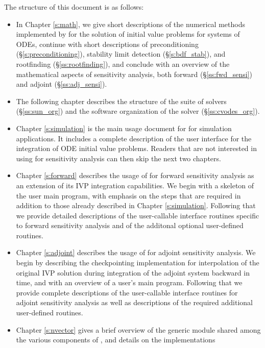 The structure of this document is as follows:
\begin{itemize}
\item
  In Chapter \ref{s:math}, we give short descriptions of the numerical 
  methods implemented by {\cvodes} for the solution of initial value problems
  for systems of ODEs, continue with short descriptions of preconditioning
  (\S\ref{s:preconditioning}), stability limit detection (\S\ref{s:bdf_stab}),
  and rootfinding (\S\ref{ss:rootfinding}), and conclude with an overview of the
  mathematical aspects of sensitivity analysis, both forward (\S\ref{ss:fwd_sensi})
  and adjoint (\S\ref{ss:adj_sensi}).
\item
  The following chapter describes the structure of the {\sundials} suite
  of solvers (\S\ref{ss:sun_org}) and the software organization of the {\cvodes}
  solver (\S\ref{ss:cvodes_org}). 
\item
  Chapter \ref{s:simulation} is the main usage document for {\cvodes}
  for simulation applications.  It includes a complete description of
  the user interface for the integration of ODE initial value problems.
  Readers that are not interested in using {\cvodes} for sensitivity
  analysis can then skip the next two chapters.
\item
  Chapter \ref{s:forward} describes the usage of {\cvodes} for forward
  sensitivity analysis as an extension of its IVP integration
  capabilities.  We begin with a skeleton of the user main program,
  with emphasis on the steps that are required in addition to those
  already described in Chapter \ref{s:simulation}.  Following that we
  provide detailed descriptions of the user-callable interface
  routines specific to forward sensitivity analysis and of the
  additonal optional user-defined routines.
\item
  Chapter \ref{s:adjoint} describes the usage of {\cvodes} for adjoint
  sensitivity analysis. We begin by describing the {\cvodes} checkpointing 
  implementation for interpolation of the original IVP solution during
  integration of the adjoint system backward in time, and with 
  an overview of a user's main program. Following that we provide complete
  descriptions of the user-callable interface routines for adjoint sensitivity
  analysis as well as descriptions of the required additional user-defined routines.
\item
  Chapter \ref{s:nvector} gives a brief overview of the generic
  {\nvector} module shared among the various components of
  {\sundials}, and details on the {\nvector} implementations

\end{itemize}

